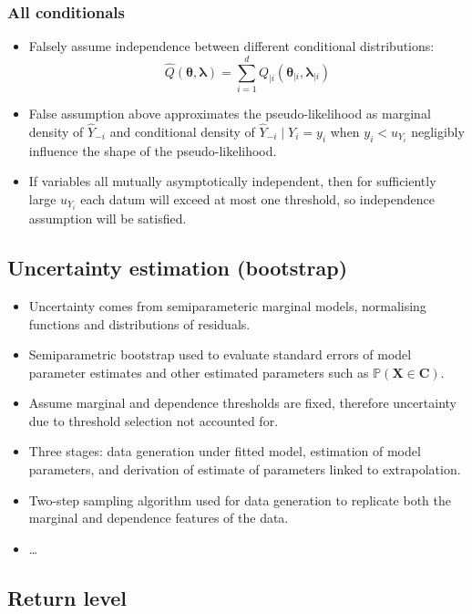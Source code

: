 \documentclass{article}
\begin{document}
\subsubsection{All conditionals}

\begin{itemize}
  \item Falsely assume independence between different conditional distributions: 
    \[
      \hat{Q}( \bm{\theta}, \bm{\lambda}) = \sum_{i=1}^{d}{Q_{\mid i}(\bm{\theta}_{\mid i}, \bm{\lambda}_{\mid i})}
    \]
  \item False assumption above approximates the pseudo-likelihood as marginal density of $\hat{Y}_{-i}$ and conditional density of $\hat{Y}_{-i} \mid Y_i = y_i$ when $y_i < u_{Y_i}$ negligibly influence the shape of the pseudo-likelihood. 
  \item If variables all mutually asymptotically independent, then for sufficiently large $u_{Y_i}$ each datum will exceed at most one threshold, so independence assumption will be satisfied. 
\end{itemize}

\subsection{Uncertainty estimation (bootstrap)}

\begin{itemize}
  \item Uncertainty comes from semiparameteric marginal models, normalising functions and distributions of residuals. 
  \item Semiparametric bootstrap used to evaluate standard errors of model parameter estimates and other estimated parameters such as $\mathbb{P}(\bm{X} \in \bm{C})$. 
  \item Assume marginal and dependence thresholds are fixed, therefore uncertainty due to threshold selection not accounted for. 
  \item Three stages: data generation under fitted model, estimation of model parameters, and derivation of estimate of parameters linked to extrapolation. 
  \item Two-step sampling algorithm used for data generation to replicate both the marginal and dependence features of the data. 
  \item \ldots
\end{itemize}


\subsection{Return level}
\end{document}
